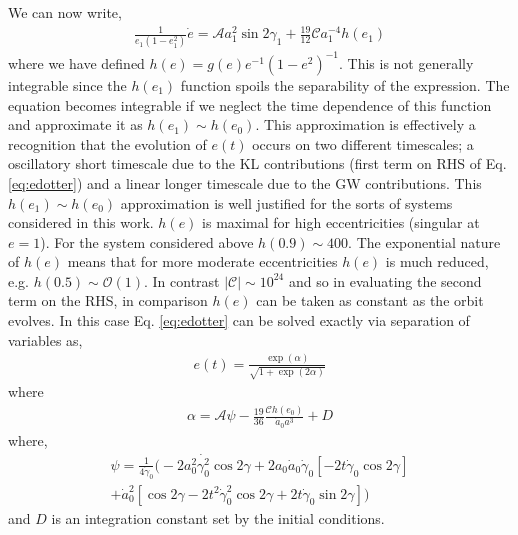 \documentclass[a4paper,fleqn,usenatbib]{mnras}
\begin{document}
\noindent We can now write,
\begin{eqnarray}
\frac{1}{e_1(1-e_1^2)}\dot{e} = \mathcal{A} a_1^2 \sin 2 \gamma_{1} + \frac{19}{12} \mathcal{C} a_1^{-4} h(e_1)
\label{eq:edotter}
\end{eqnarray}
where  we have defined  $h(e) = g(e) e^{-1} (1-e^2)^{-1}$.  This is not generally integrable since the $h(e_1)$ function spoils the separability of the expression. The equation becomes integrable if we neglect the time dependence of this function and approximate it as $h(e_1) \sim h(e_0)$. This approximation is effectively a recognition that the evolution of $e(t)$ occurs on two different timescales; a oscillatory short timescale due to the KL contributions (first term on RHS of Eq. \ref{eq:edotter}) and a linear longer timescale due to the GW contributions. This $h(e_1) \sim h(e_0)$ approximation is well justified for the sorts of systems considered in this work. $h(e)$ is maximal for high eccentricities (singular at $e=1$). For the system considered above $h(0.9) \sim 400$. The exponential nature of $h(e)$ means that for more moderate eccentricities $h(e)$ is much reduced, e.g. $ h(0.5) \sim \mathcal{O} (1)$. In contrast $|\mathcal{C}| \sim 10^{24}$ and so in evaluating the second term on the RHS, in comparison $h(e)$ can be taken as constant as the orbit evolves. In this case Eq. \ref{eq:edotter} can be solved exactly via separation of variables as, 
\begin{eqnarray}
e(t) = \frac{\exp (\alpha)}{\sqrt{1 + \exp (2 \alpha)}}
\end{eqnarray}
where 
\begin{eqnarray}
\alpha = \mathcal{A} \psi - \frac{19}{36} \frac{\mathcal{C} h(e_0)}{\dot{a}_0 a^3} + D
\end{eqnarray}
where,
\begin{align}
\psi = \frac{1}{4 \dot{\gamma}_0} \Bigg ( - 2a_0^2 \dot{\gamma_0^2} \cos2 \gamma + 2 a_0 \dot{a}_0 \dot{\gamma}_0 \left[-2t \dot{\gamma}_0 \cos 2 \gamma \right] \\
+ \dot{a}_0^2 \left[\cos 2 \gamma - 2t^2 \dot{\gamma}_0^2 \cos 2 \gamma + 2 t \dot{\gamma}_0 \sin 2 \gamma \right] \Bigg )
\end{align}
and $D$ is an integration constant set by the initial conditions.
\end{document}
